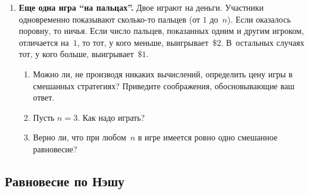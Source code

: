 \documentclass[a4paper,12pt]{article}
\begin{document}
\begin{enumerate}
\item {\bf Еще одна игра ``на пальцах''.} Двое играют на
деньги. Участники одновременно показывают сколько-то
пальцев (от $1$ до~$n$). Если оказалось поровну, то ничья.
Если число пальцев, показанных одним и другим игроком,
отличается на~$1$, то тот, у кого меньше, выигрывает~$\$2$.
В~остальных случаях тот, у кого больше, выигрывает~$\$1$.

\begin{enumerate}

\item Можно ли, не производя никаких вычислений, определить
цену игры в смешанных стратегиях? Приведите соображения,
обосновывающие ваш ответ.

\item Пусть $n=3$. Как надо играть?

\item Верно ли, что при любом~$n$ в игре имеется ровно одно
смешанное равновесие?

\end{enumerate}

\end{enumerate}

\subsection{Равновесие по Нэшу}
\end{document}
